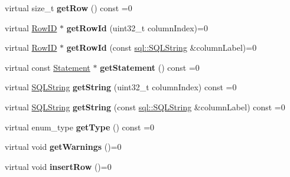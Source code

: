 \begin{DoxyCompactItemize}
\item 
\hypertarget{classsql_1_1_result_set_aab3bf09cb47bac7e190e2f8ce2f8957f}{}\label{classsql_1_1_result_set_aab3bf09cb47bac7e190e2f8ce2f8957f} 
virtual size\+\_\+t {\bfseries get\+Row} () const =0
\item 
\hypertarget{classsql_1_1_result_set_afbe3ef109a7ff79821bc226eba506cfe}{}\label{classsql_1_1_result_set_afbe3ef109a7ff79821bc226eba506cfe} 
virtual \hyperlink{classsql_1_1_row_i_d}{Row\+ID} $\ast$ {\bfseries get\+Row\+Id} (uint32\+\_\+t column\+Index)=0
\item 
\hypertarget{classsql_1_1_result_set_aad1f9383386630435e0c1fc9812b1d9c}{}\label{classsql_1_1_result_set_aad1f9383386630435e0c1fc9812b1d9c} 
virtual \hyperlink{classsql_1_1_row_i_d}{Row\+ID} $\ast$ {\bfseries get\+Row\+Id} (const \hyperlink{classsql_1_1_s_q_l_string}{sql\+::\+S\+Q\+L\+String} \&column\+Label)=0
\item 
\hypertarget{classsql_1_1_result_set_a78393bf300a65504bd0dfd5c0875daa8}{}\label{classsql_1_1_result_set_a78393bf300a65504bd0dfd5c0875daa8} 
virtual const \hyperlink{classsql_1_1_statement}{Statement} $\ast$ {\bfseries get\+Statement} () const =0
\item 
\hypertarget{classsql_1_1_result_set_a7c3cf1845e0188c7188393b39e804c5f}{}\label{classsql_1_1_result_set_a7c3cf1845e0188c7188393b39e804c5f} 
virtual \hyperlink{classsql_1_1_s_q_l_string}{S\+Q\+L\+String} {\bfseries get\+String} (uint32\+\_\+t column\+Index) const =0
\item 
\hypertarget{classsql_1_1_result_set_a77fd2cc81545b3e6c65abb1747a0cbe7}{}\label{classsql_1_1_result_set_a77fd2cc81545b3e6c65abb1747a0cbe7} 
virtual \hyperlink{classsql_1_1_s_q_l_string}{S\+Q\+L\+String} {\bfseries get\+String} (const \hyperlink{classsql_1_1_s_q_l_string}{sql\+::\+S\+Q\+L\+String} \&column\+Label) const =0
\item 
\hypertarget{classsql_1_1_result_set_a66f7244d850c7aa65c657d7739027980}{}\label{classsql_1_1_result_set_a66f7244d850c7aa65c657d7739027980} 
virtual enum\+\_\+type {\bfseries get\+Type} () const =0
\item 
\hypertarget{classsql_1_1_result_set_a84b8246c1c38cb6394ef9a45837036d4}{}\label{classsql_1_1_result_set_a84b8246c1c38cb6394ef9a45837036d4} 
virtual void {\bfseries get\+Warnings} ()=0
\item 
\hypertarget{classsql_1_1_result_set_ab352d633c1ec1c4c5a5531274160ae36}{}\label{classsql_1_1_result_set_ab352d633c1ec1c4c5a5531274160ae36} 
virtual void {\bfseries insert\+Row} ()=0
\item 

\end{DoxyCompactItemize}
